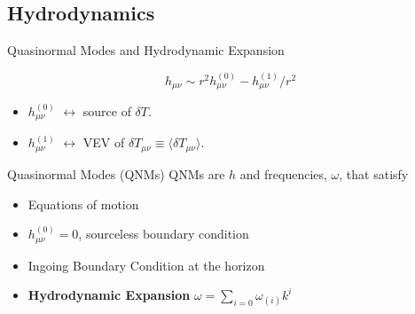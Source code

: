 \documentclass[aspectratio=169, xcolor=dvipsnames]{beamer}
\begin{document}

\subsection{Hydrodynamics}

\begin{frame}{Quasinormal Modes and Hydrodynamic Expansion}

  \begin{equation*}
    h_{\mu\nu} \sim r^2 h^{\mathrm{(0)}}_{\mu\nu} - h^{\mathrm{(1)}}_{\mu\nu}/r^2
  \end{equation*}

  \begin{itemize}
    \item \(h^{\mathrm{(0)}}_{\mu\nu}\) \(\leftrightarrow\) source of
      \(\delta T\).
    \item \(h^{\mathrm{(1)}}_{\mu\nu}\) \(\leftrightarrow\) VEV of
      \(\delta T_{\mu\nu} \equiv \langle \delta T_{\mu\nu} \rangle\).
  \end{itemize}

  \vfill


  \begin{block}{Quasinormal Modes (QNMs)}
    QNMs are $h$ and frequencies, $\omega$, that satisfy
    \begin{itemize}
      \item Equations of motion
      \item \(h^{\mathrm{(0)}}_{\mu\nu} = 0\), sourceless boundary condition
      \item Ingoing Boundary Condition at the horizon
    \end{itemize}
  \end{block}

  \vfill

  \begin{itemize}
    \item \textbf{ Hydrodynamic Expansion } $\omega = \sum_{i=0} \omega_{(i)} k^i$
  \end{itemize}


\end{frame}

\end{document}
